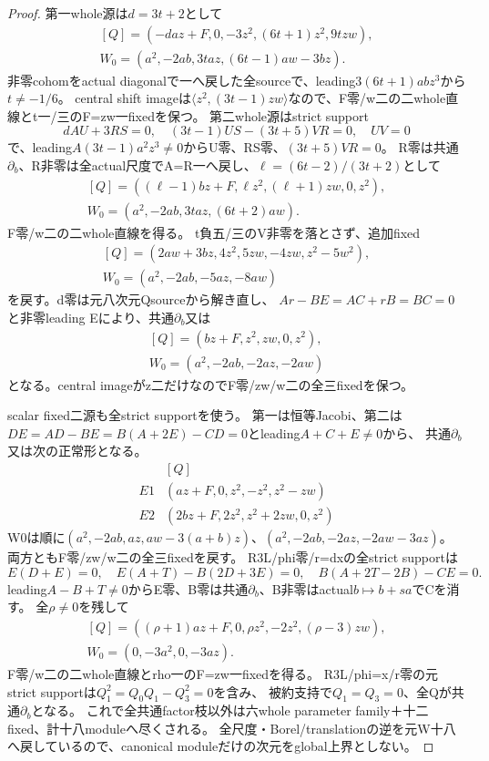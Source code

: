\documentclass[a4paper,11pt]{ltjsarticle}
\theoremstyle{definition}
\begin{document}
\begin{proof}
第一whole源は$d=3t+2$として
\[
\begin{gathered}
 [Q]=(-daz+F,0,-3z^2,(6t+1)z^2,9tzw),\\
 W_0=(a^2,-2ab,3taz,(6t-1)aw-3bz).
\end{gathered}
\]
非零cohomをactual diagonalで一へ戻した全sourceで、leading$3(6t+1)abz^3$から$t\ne-1/6$。
central shift imageは$\langle z^2,(3t-1)zw\rangle$なので、F零/w二の二whole直線とt一/三のF=zw一fixedを保つ。
第二whole源はstrict support
\[
 dAU+3RS=0,\quad(3t-1)US-(3t+5)VR=0,\quad UV=0
\]
で、leading$A(3t-1)a^2z^3\ne0$からU零、RS零、$(3t+5)VR=0$。
R零は共通$\partial_b$、R非零は全actual尺度でA=R一へ戻し、$\ell=(6t-2)/(3t+2)$として
\[
\begin{gathered}
 [Q]=((\ell-1)bz+F,\ell z^2,(\ell+1)zw,0,z^2),\\
 W_0=(a^2,-2ab,3taz,(6t+2)aw).
\end{gathered}
\]
F零/w二の二whole直線を得る。
t負五/三のV非零を落とさず、追加fixed
\[
\begin{gathered}
 [Q]=(2aw+3bz,4z^2,5zw,-4zw,z^2-5w^2),\\
 W_0=(a^2,-2ab,-5az,-8aw)
\end{gathered}
\]
を戻す。d零は元八次元Qsourceから解き直し、
$Ar-BE=AC+rB=BC=0$と非零leading Eにより、共通$\partial_b$又は
\[
\begin{gathered}
 [Q]=(bz+F,z^2,zw,0,z^2),\\
 W_0=(a^2,-2ab,-2az,-2aw)
\end{gathered}
\]
となる。central imageがz二だけなのでF零/zw/w二の全三fixedを保つ。

scalar fixed二源も全strict supportを使う。
第一は恒等Jacobi、第二は$DE=AD-BE=B(A+2E)-CD=0$とleading$A+C+E\ne0$から、
共通$\partial_b$又は次の正常形となる。
\[
\begin{array}{c|l}
 &[Q]\\\hline
 E1& (az+F,0,z^2,-z^2,z^2-zw)\\
 E2& (2bz+F,2z^2,z^2+2zw,0,z^2)
\end{array}
\]
W0は順に$(a^2,-2ab,az,aw-3(a+b)z)$、$(a^2,-2ab,-2az,-2aw-3az)$。
両方ともF零/zw/w二の全三fixedを戻す。
R3L/phi零/r=dxの全strict supportは
\[
 E(D+E)=0,\quad E(A+T)-B(2D+3E)=0,\quad
 B(A+2T-2B)-CE=0.
\]
leading$A-B+T\ne0$からE零、B零は共通$\partial_b$、B非零はactual$b\mapsto b+sa$でCを消す。
全$\rho\ne0$を残して
\[
\begin{gathered}
 [Q]=((\rho+1)az+F,0,\rho z^2,-2z^2,(\rho-3)zw),\\
 W_0=(0,-3a^2,0,-3az).
\end{gathered}
\]
F零/w二の二whole直線とrho一のF=zw一fixedを得る。
R3L/phi=x/r零の元strict supportは$Q_1^2=Q_0Q_1-Q_3^2=0$を含み、
被約支持で$Q_1=Q_3=0$、全Qが共通$\partial_b$となる。
これで全共通factor枝以外は六whole parameter family＋十二fixed、計十八moduleへ尽くされる。
全尺度・Borel/translationの逆を元W十八へ戻しているので、canonical moduleだけの次元をglobal上界としない。


\end{proof}
\end{document}
